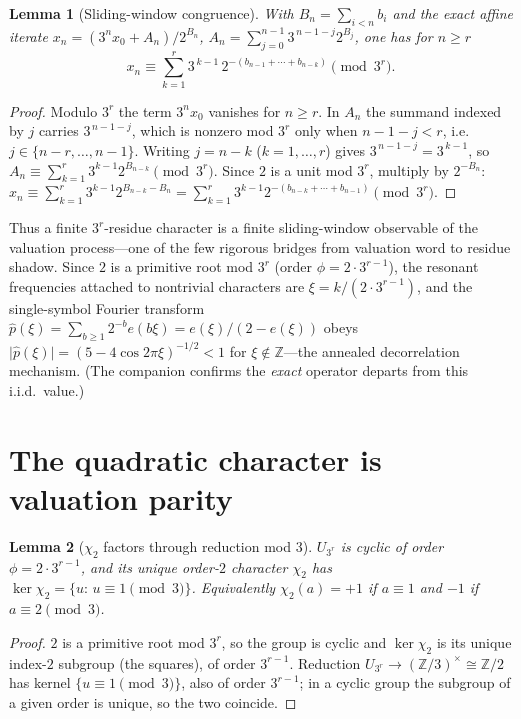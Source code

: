 \documentclass[11pt]{article}
\newcommand{\Z}{\mathbb{Z}}
\newcommand{\UQ}{U_{3^r}}
\theoremstyle{plain}
\newtheorem{lemma}{Lemma}
\theoremstyle{definition}
\theoremstyle{remark}
\begin{document}
\begin{lemma}[Sliding-window congruence]\label{lem:cong}
With $B_n=\sum_{i<n}b_i$ and the exact affine iterate
$x_n=(3^n x_0+A_n)/2^{B_n}$, $A_n=\sum_{j=0}^{n-1}3^{\,n-1-j}2^{B_j}$, one has for
$n\ge r$
\[
x_n\equiv\sum_{k=1}^{r}3^{\,k-1}\,2^{-(b_{n-1}+\cdots+b_{n-k})}\pmod{3^r}.
\]
\end{lemma}
\begin{proof}
Modulo $3^r$ the term $3^n x_0$ vanishes for $n\ge r$. In $A_n$ the summand
indexed by $j$ carries $3^{\,n-1-j}$, which is nonzero mod $3^r$ only when
$n-1-j<r$, i.e.\ $j\in\{n-r,\dots,n-1\}$. Writing $j=n-k$ ($k=1,\dots,r$) gives
$3^{\,n-1-j}=3^{\,k-1}$, so $A_n\equiv\sum_{k=1}^r 3^{k-1}2^{B_{n-k}}\pmod{3^r}$.
Since $2$ is a unit mod $3^r$, multiply by $2^{-B_n}$:
$x_n\equiv\sum_{k=1}^r3^{k-1}2^{B_{n-k}-B_n}=\sum_{k=1}^r
3^{k-1}2^{-(b_{n-k}+\cdots+b_{n-1})}\pmod{3^r}$.
\end{proof}

\noindent Thus a finite $3^r$-residue character is a finite sliding-window
observable of the valuation process---one of the few rigorous bridges from
valuation word to residue shadow. Since $2$ is a primitive root mod $3^r$ (order
$\phi=2\cdot3^{r-1}$), the resonant frequencies attached to nontrivial characters
are $\xi=k/(2\cdot3^{r-1})$, and the single-symbol Fourier transform
$\hat p(\xi)=\sum_{b\ge1}2^{-b}e(b\xi)=e(\xi)/(2-e(\xi))$ obeys
$\lvert\hat p(\xi)\rvert=(5-4\cos2\pi\xi)^{-1/2}<1$ for $\xi\notin\Z$---the
annealed decorrelation mechanism. (The companion confirms the \emph{exact}
operator departs from this i.i.d.\ value.)

\section{The quadratic character is valuation parity}

\begin{lemma}[$\chi_2$ factors through reduction mod $3$]\label{lem:fac3}
$\UQ$ is cyclic of order $\phi=2\cdot3^{r-1}$, and its unique order-$2$ character
$\chi_2$ has $\ker\chi_2=\{u:\,u\equiv1\!\!\pmod3\}$. Equivalently
$\chi_2(a)=+1$ if $a\equiv1$ and $-1$ if $a\equiv2\pmod3$.
\end{lemma}
\begin{proof}
$2$ is a primitive root mod $3^r$, so the group is cyclic and $\ker\chi_2$ is its
unique index-$2$ subgroup (the squares), of order $3^{r-1}$. Reduction
$\UQ\to(\Z/3)^\times\cong\Z/2$ has kernel $\{u\equiv1\!\pmod3\}$, also of order
$3^{r-1}$; in a cyclic group the subgroup of a given order is unique, so the two
coincide.
\end{proof}
\end{document}

